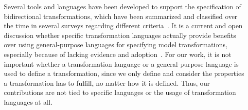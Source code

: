 Several tools and languages have been developed to support the specification of bidirectional transformations, which have been summarized and classified over the time in several surveys regarding different criteria~\cite{stevens2008LandscapeBidirectionalTransformation-GTTSE, diRuscio2012transformations-SFM, kusel2013SurveyIncrementalTransformation-ME, jakumeit2014transformationTools-SCP, samimi-dehkordi2015bidirectionalSynchronization-ICCKE, samimi-dehkordi2016iccke,hidaka2016classificationTransformations-SoSym,kahani2019SurveyTransformationTools-SoSym}.
It is a current and open discussion whether specific transformation languages actually provide benefits over using general-purpose languages for specifying model transformations, especially because of lacking evidence and adoption~\cite{burgueno2019futureTransformationLanguages-ICMT}. 
For our work, it is not important whether a transformation language or a general-purpose language is used to define a transformation, since we only define and consider the properties a transformation has to fulfill, no matter how it is defined.
Thus, our contributions are not tied to specific languages or the usage of transformation languages at all.

